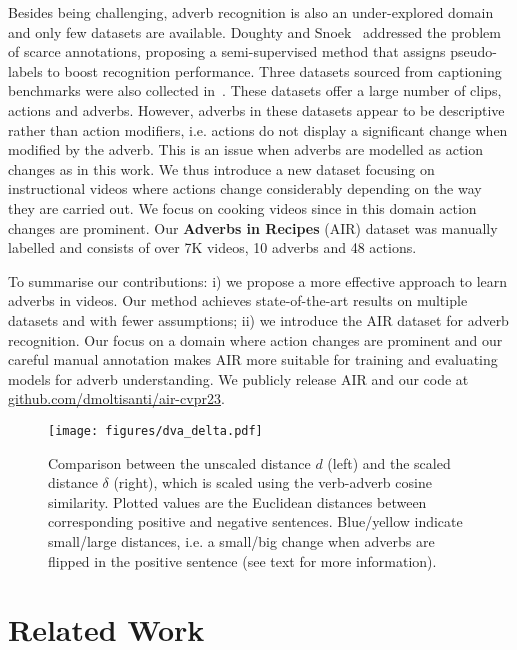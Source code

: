 \documentclass[10pt,twocolumn,letterpaper]{article}
\begin{document}
Besides being challenging, adverb recognition is also an under-explored domain and only few datasets are available.
Doughty and Snoek~\cite{doughty2022you} addressed the problem of scarce annotations, proposing a semi-supervised method that assigns pseudo-labels 
to boost recognition performance.  
Three datasets sourced from captioning benchmarks were also collected in~\cite{doughty2022you}. 
These datasets offer a large number of clips, actions and adverbs. However, 
adverbs in these datasets appear to be 
descriptive rather than action modifiers, i.e. actions do not display a significant change when modified by the adverb. 
This is an issue when adverbs are modelled as action changes as in this work. 
We thus introduce a new dataset focusing on instructional videos where actions change considerably depending on the way they are carried out. We focus on cooking videos since in this domain action changes are prominent. Our \textbf{Adverbs in Recipes} (AIR) dataset was manually labelled and consists of over 7K videos, 10 adverbs and 48 actions. 

To summarise our contributions: i) we propose a more effective approach to learn adverbs in videos. Our method achieves state-of-the-art results on multiple datasets and with fewer assumptions; ii) we introduce the AIR dataset for adverb recognition. 
Our focus on a domain where action changes are prominent and our careful manual annotation makes AIR more suitable for training and evaluating models for adverb understanding. We publicly release AIR and our code at \href{https://github.com/dmoltisanti/air-cvpr23}{github.com/dmoltisanti/air-cvpr23}.

\begin{figure*}
    \centering
    \texttt{[image: figures/dva\_delta.pdf]}
    \caption{Comparison between the unscaled distance $d$ (left) and the scaled distance $\delta$ (right), which is scaled using the verb-adverb cosine similarity. Plotted values are the Euclidean distances between corresponding positive and negative sentences. Blue/yellow indicate small/large distances, i.e. a small/big change when adverbs are flipped in the positive sentence (see text for more information). 
    }
    \label{fig:dva}
    \vspace{-5pt}
\end{figure*}

\vspace{-7pt}
\section{Related Work}
\label{sec:related_work}
\end{document}
